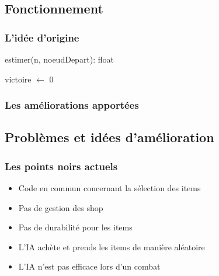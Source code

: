 \documentclass[beamer]{BetterDocument}
\begin{document}
	\subsection{Fonctionnement}
	\begin{frame}
		\frametitle{L'idée d'origine}

		\begin{algorithm}[H]
			\caption{estimer(n, noeudDepart): float}
  			\scriptsize
			\DontPrintSemicolon
			victoire $\gets$ 0\;

			\;
		\end{algorithm}
	\end{frame}

	\begin{frame}
		\frametitle{Les améliorations apportées}
	\end{frame}

	\subsection{Problèmes et idées d'amélioration}
	\begin{frame}
		\frametitle{Les points noirs actuels}

		\begin{itemize}
			\item{Code en commun concernant la sélection des items}
			\item{Pas de gestion des shop}
			\item{Pas de durabilité pour les items}
			\item{L'IA achète et prends les items de manière aléatoire}
			\item{L'IA n'est pas efficace lors d'un combat}
		\end{itemize}
	\end{frame}
\end{document}
